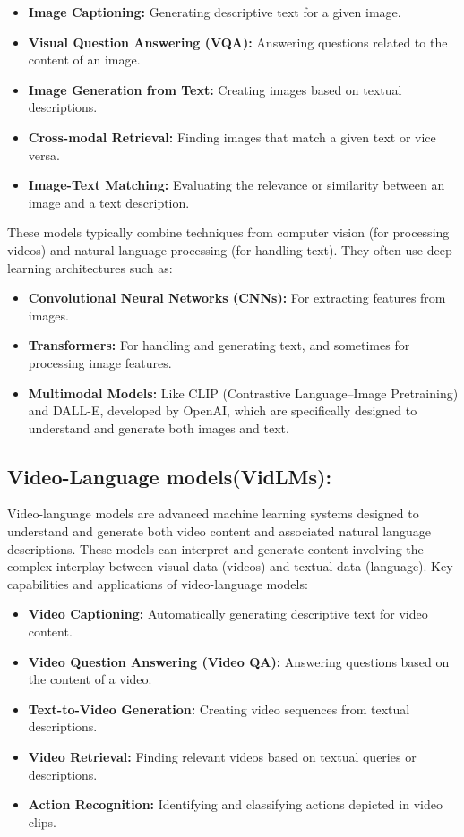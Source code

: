 \begin{itemize}
\item \textbf{Image Captioning:} Generating descriptive text for a given image.
\item \textbf{Visual Question Answering (VQA):} Answering questions related to the content of an image.
\item \textbf{Image Generation from Text:} Creating images based on textual descriptions.
\item \textbf{Cross-modal Retrieval:} Finding images that match a given text or vice versa.
\item \textbf{Image-Text Matching:} Evaluating the relevance or similarity between an image and a text description.
\end{itemize}

\noindent These models typically combine techniques from computer vision (for processing videos) and natural language processing (for handling text). They often use deep learning architectures such as:

\begin{itemize}
\item \textbf{Convolutional Neural Networks (CNNs):} For extracting features from images.
\item \textbf{Transformers:} For handling and generating text, and sometimes for processing image features.
\item \textbf{Multimodal Models:} Like CLIP (Contrastive Language–Image Pretraining) and DALL-E, developed by OpenAI, which are specifically designed to understand and generate both images and text.
\end{itemize}
\subsection{Video-Language models(VidLMs):}
\noindent Video-language models are advanced machine learning systems designed to understand and generate both video content and associated natural language descriptions. These models can interpret and generate content involving the complex interplay between visual data (videos) and textual data (language). Key capabilities and applications of video-language models:

\begin{itemize}
\item \textbf{Video Captioning:} Automatically generating descriptive text for video content.
\item \textbf{Video Question Answering (Video QA):} Answering questions based on the content of a video.
\item \textbf{Text-to-Video Generation:} Creating video sequences from textual descriptions.
\item \textbf{Video Retrieval:} Finding relevant videos based on textual queries or descriptions.
\item \textbf{Action Recognition:} Identifying and classifying actions depicted in video clips.
\end{itemize}

